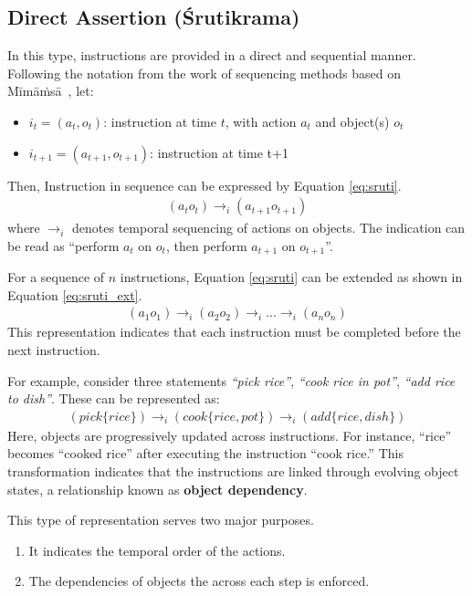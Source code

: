 \documentclass[a4paper,11pt]{lmcs}
\newcommand{\mimamsa}{M\={i}m\={a}\.ms\={a}}
\begin{document}
\subsection{Direct Assertion (\'{S}rutikrama)}
\label{sec:sruti}
In this type, instructions are provided in a direct and sequential manner. Following the notation from the work of sequencing methods based on \mimamsa~\cite{llm_mira}, let:
\begin{itemize}
 \item $i_t = (a_t,o_t)$: instruction at time $t$, with action $a_t$ and object(s) $o_t$
\item $i_{t+1} = (a_{t+1},o_{t+1})$: instruction at time t+1
 \end{itemize}
Then, Instruction in sequence can be expressed by Equation \ref{eq:sruti}.
\begin{eqnarray}
\label{eq:sruti}
 (a_t o_t) \rightarrow_i (a_{t+1}o_{t+1})
\end{eqnarray}
where $\rightarrow_i$ denotes temporal sequencing of actions on objects. The indication can be read as  ``perform $a_t$ on $o_t$, then perform $a_{t+1}$ on $o_{t+1}$''.

For a sequence of $n$ instructions, Equation \ref{eq:sruti} can be extended as shown in Equation \ref{eq:sruti_ext}.
\begin{eqnarray}
 \label{eq:sruti_ext}
 (a_1o_1) \rightarrow_i (a_2o_2) \rightarrow_i ... \rightarrow_i (a_no_n)
\end{eqnarray}
This representation indicates that each instruction must be completed before the next instruction.

For example, consider three statements \textit{``pick rice''}, \textit{``cook rice in pot''}, \textit{``add rice to dish''}. These can be represented as:
\begin{eqnarray}
 (pick \{rice\}) \rightarrow_i (cook \{rice,
 pot\}) \rightarrow_i (add \{rice,dish\})
\end{eqnarray}
Here, objects are progressively updated across instructions. For instance, “rice” becomes “cooked rice” after executing the instruction “cook rice.” This transformation indicates that the instructions are linked through evolving object states, a relationship known as \textbf{object dependency}.

This type of representation serves two major purposes.

\begin{enumerate}
 \item It indicates the temporal order of the actions.
 \item The dependencies of objects the across each step is enforced.
\end{enumerate}
\end{document}
